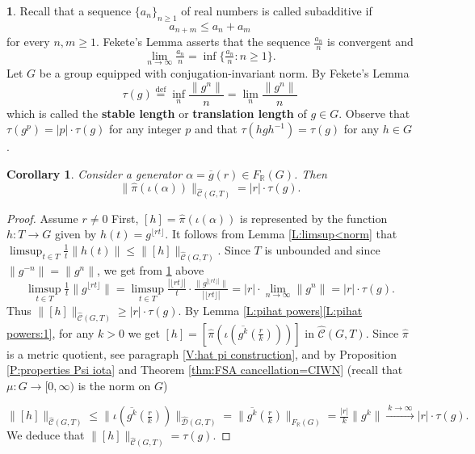 \documentclass[12pt]{amsart}
\newtheorem{cor}[prop]{Corollary}
\theoremstyle{definition}
\newtheorem{void}[prop]{}
\def\RR{\ensuremath{\mathbb{R}}}
\newcommand{\xto}[1]{\xrightarrow{#1}}
\def\Free{F}
\def\D{\mathcal{D}}
\def\tC{\hat{\mathcal{C}}}
\def\tD{\hat{\D}}
\newcommand{\Myfloor}[1]{\lfloor #1 \rfloor}
\newcommand{\myfloor}[1]{\llfloor #1 \rrfloor}
\begin{document}
\begin{void}\label{V:stable length}
Recall that a sequence $\{ a_n\}_{n \geq 1}$ of real numbers is called subadditive if
\[
a_{n+m} \leq a_n + a_m
\]
for every $n,m \geq 1$.
Fekete's Lemma \cite{MR1544613} asserts that the sequence $\tfrac{a_n}{n}$ is convergent and
\[
\lim_{n \to \infty} \tfrac{a_n}{n} = \inf \{ \tfrac{a_n}{n} : n \geq 1\}.
\]
Let $G$ be a group equipped with conjugation-invariant norm.
By Fekete's Lemma 
\[
\tau(g) \overset{\text{def}}{=} \inf_n \frac{\|g^n\|}{n} = \lim_n \frac{\|g^n\|}{n}
\]
which is called the {\bf stable length} or {\bf translation length} of $g \in G$.
Observe that $\tau(g^p)=|p| \cdot \tau(g)$ for any integer $p$ and that $\tau(hgh^{-1})=\tau(g)$ for any $h \in G$.
\end{void}


\begin{cor}\label{cor:Cnorm image of generators in FRG}
Consider a generator $\alpha=\overline{g}(r) \in \Free_\RR(G)$.
Then
\[
\| \hat{\pi}(\iota(\alpha))\|_{\tC(G,T)} = |r| \cdot \tau(g).
\]
\end{cor}

\begin{proof}
Assume $r \neq 0$
First, $[h]=\hat{\pi}(\iota(\alpha))$ is represented by the function $h \colon T \to G$ given by
$h(t)=g^{\Myfloor{rt}}$.
It follows from Lemma \ref{L:limsup<norm} that $\limsup_{t \in T} \tfrac{1}{t} \|h(t)\| \leq \|[h]\|_{\tC(G,T)}$.
Since $T$ is unbounded and since $\|g^{-n}\|=\|g^{n}\|$, we get from \ref{V:stable length} above 
\[
\limsup_{t \in T} \tfrac{1}{t}\| g^{\Myfloor{rt}}\| 
=
\limsup_{t \in T} \tfrac{|\Myfloor{rt}|}{t} \cdot \tfrac{\| g^{|\Myfloor{rt}|} \|}{|\Myfloor{rt}|}
=
|r| \cdot \lim_{n \to \infty} \|g^n\| =|r| \cdot \tau(g).
\]
Thus $\|[h]\|_{\tC(G,T)} \geq |r| \cdot \tau(g)$.
By Lemma \ref{L:pihat powers}\ref{L:pihat powers:1}, for any $k >0$ we get $[h]=[\hat{\pi}(\iota(\overline{g^k}(\tfrac{r}{k})))]$ in $\tC(G,T)$.
Since $\hat{\pi}$ is a metric quotient, see paragraph \ref{V:hat pi construction}, and by Proposition \ref{P:properties Psi iota} and Theorem \ref{thm:FSA cancellation=CIWN} (recall that $\mu \colon G \to [0,\infty)$ is the norm on $G$)

\[
\| [h]\|_{\tC(G,T)} 
\leq 
\| \iota(\overline{g^k}(\tfrac{r}{k})) \|_{\tD(G,T)}
=
\| \overline{g^k}(\tfrac{r}{k})\|_{\Free_\RR(G)} 
= \tfrac{|r|}{k} \|g^k\| 
\xto{ \  k \to \infty \ } |r| \cdot \tau(g).
\]
We deduce that $\|[h]\|_{\tC(G,T)}=\tau(g)$.
\end{proof}
\end{document}
